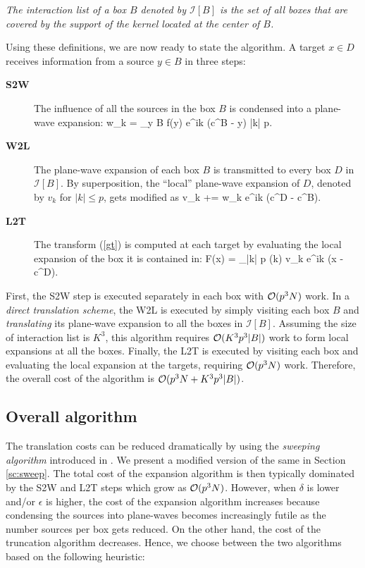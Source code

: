 \begin{mydef} {\em The interaction list of a box $B$ denoted by $\mathcal{I}[B]$ is the set of all boxes that are covered by the support of the kernel located at the center of $B$. }
\end{mydef} 
%
Using these definitions, we are now ready to state the algorithm. A target $x \in D$ receives information from a source $y \in B$ in three steps:
\begin{description}
\item[\textbf{S2W}] The influence of all the sources in the box $B$ is condensed into a plane-wave expansion:
            \beq w_k = \sum_{y \in B} f(y) e^{i\lambda k \cdot (c^B - y)} \quad \forall\quad |k| \leq p.  \label{eqn:s2w} \eeq
            
\item[\textbf{W2L}] The plane-wave expansion of each box $B$ is transmitted to every box $D$ in $\mathcal{I}[B]$. By
 superposition, the ``local'' plane-wave expansion of $D$, denoted by $v_k$ for $|k| \leq p$, gets modified as
            \beq v_k += w_k e^{i\lambda k \cdot (c^D - c^B)}. \label{e:w2l}\eeq
            
\item[\textbf{L2T}] The transform (\ref{gt}) is computed at each target by evaluating the local expansion of the 
box it is contained in:
            \beq F(x) = \sum_{|k| \leq p} (k) v_k e^{i\lambda k \cdot (x - c^D)}. \label{eqn:l2t}\eeq
\end{description} 

First, the S2W step is executed separately in each box with $\mathcal{O}(p^3 N)$ work. In a {\em direct translation scheme}, 
the W2L is executed by simply visiting each box $B$ and {\em translating} its plane-wave expansion to all the boxes
 in $\mathcal{I}[B]$. Assuming the size of interaction list is $K^3$, this algorithm requires $\mathcal{O}(K^3 p^3 |B|)$ work 
 to form local expansions at all the boxes. Finally, the L2T is executed by visiting each box and evaluating the 
 local expansion at the targets, requiring $\mathcal{O}(p^3 N)$ work. Therefore, the overall cost of the algorithm is $\mathcal{O}(p^3 N + K^3 p^3 |B|)$.  

\subsection{Overall algorithm} 
The translation costs can be reduced dramatically by using the {\em sweeping algorithm} introduced in \cite{greengard98}. We present a modified version of the same in Section \ref{sc:sweep}. The total cost of the expansion algorithm is then typically dominated by the S2W and L2T steps which grow as $\mathcal{O}(p^3 N)$. However, when $\delta$ is lower and/or $\epsilon$ is higher, the cost of the expansion algorithm increases because condensing the sources into plane-waves becomes increasingly futile as
 the number sources per box gets reduced. On the other hand, the cost of the truncation algorithm decreases. Hence, we choose between the two algorithms based on the following heuristic:

